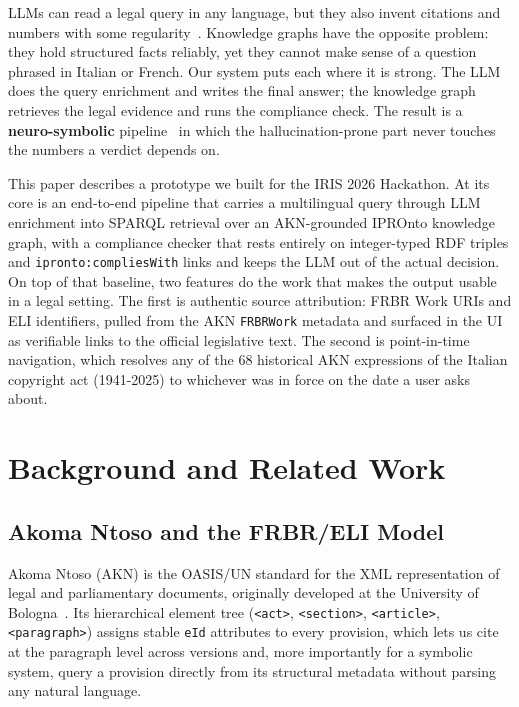 \documentclass[12pt,a4paper]{article}
\begin{document}
LLMs can read a legal query in any language, but they also invent
citations and numbers with some regularity~\cite{huang2023}. Knowledge
graphs have the opposite problem: they hold structured facts reliably,
yet they cannot make sense of a question phrased in Italian or French.
Our system puts each where it is strong. The LLM does the query
enrichment and writes the final answer; the knowledge graph retrieves
the legal evidence and runs the compliance check. The result is a
\textbf{neuro-symbolic} pipeline~\cite{hitzler2022} in which the
hallucination-prone part never touches the numbers a verdict depends on.

This paper describes a prototype we built for the IRIS 2026 Hackathon. At
its core is an end-to-end pipeline that carries a multilingual query
through LLM enrichment into SPARQL retrieval over an AKN-grounded IPROnto
knowledge graph, with a compliance checker that rests entirely on
integer-typed RDF triples and \texttt{ipronto:compliesWith} links and keeps
the LLM out of the actual decision. On top of that baseline, two features
do the work that makes the output usable in a legal setting. The first is
authentic source attribution: FRBR Work URIs and ELI identifiers, pulled
from the AKN \texttt{FRBRWork} metadata and surfaced in the UI as verifiable
links to the official legislative text. The second is point-in-time
navigation, which resolves any of the 68 historical AKN expressions of the
Italian copyright act (1941-2025) to whichever was in force on the date a
user asks about.

\section{Background and Related Work}

\subsection{Akoma Ntoso and the FRBR/ELI Model}

Akoma Ntoso (AKN) is the OASIS/UN standard for the XML representation of
legal and parliamentary documents, originally developed at the University
of Bologna~\cite{oasis2018,palmirani2011}. Its hierarchical element tree
(\texttt{<act>}, \texttt{<section>}, \texttt{<article>},
\texttt{<paragraph>}) assigns stable \texttt{eId} attributes to every
provision, which lets us cite at the paragraph level across versions and,
more importantly for a symbolic system, query a provision directly from its
structural metadata without parsing any natural language.
\end{document}
